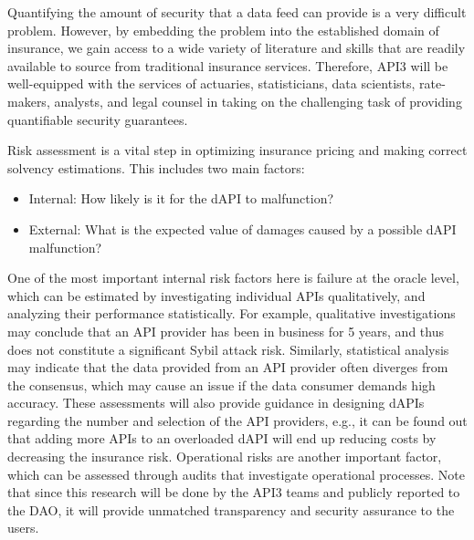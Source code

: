 \documentclass[11pt]{article}
\begin{document}
Quantifying the amount of security that a data feed can provide is a very difficult problem.
However, by embedding the problem into the established domain of insurance, we gain access to a wide variety of literature and skills that are readily available to source from traditional insurance services.
Therefore, API3 will be well-equipped with the services of actuaries, statisticians, data scientists, rate-makers, analysts, and legal counsel in taking on the challenging task of providing quantifiable security guarantees.

Risk assessment is a vital step in optimizing insurance pricing and making correct solvency estimations.
This includes two main factors:
\begin{itemize}
    \item Internal: How likely is it for the dAPI to malfunction?
    \item External: What is the expected value of damages caused by a possible dAPI malfunction?
\end{itemize}

One of the most important internal risk factors here is failure at the oracle level, which can be estimated by investigating individual APIs qualitatively, and analyzing their performance statistically.
For example, qualitative investigations may conclude that an API provider has been in business for 5 years, and thus does not constitute a significant Sybil attack risk.
Similarly, statistical analysis may indicate that the data provided from an API provider often diverges from the consensus, which may cause an issue if the data consumer demands high accuracy.
These assessments will also provide guidance in designing dAPIs regarding the number and selection of the API providers, e.g., it can be found out that adding more APIs to an overloaded dAPI will end up reducing costs by decreasing the insurance risk.
Operational risks are another important factor, which can be assessed through audits that investigate operational processes.
Note that since this research will be done by the API3 teams and publicly reported to the DAO, it will provide unmatched transparency and security assurance to the users.
\end{document}

